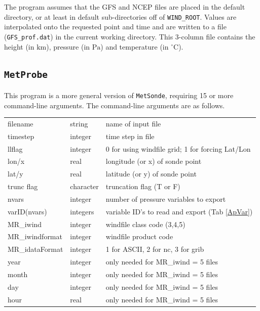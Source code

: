 \documentclass[11pt]{article}   %
\begin{document}
The program assumes that the GFS and NCEP files are placed in the default directory, or
at least in default sub-directories off of \texttt{WIND\_ROOT}.  Values are interpolated
onto the requested point and time and are written to a file (\texttt{GFS\_prof.dat}) in
the current working directory.  This 3-column file contains the height (in $\mathrm{km}$),
pressure (in $\mathrm{Pa}$) and temperature (in $^{\circ}\mathrm{C}$).

\subsection{\texttt{MetProbe}}
This program is a more general version of \texttt{MetSonde}, requiring 15 or more command-line
arguments.  The command-line arguments are as follows.
\\
\begin{tabular}{ l  l  l }
filename        & string    & name of input file \\
timestep        & integer   & time step in file \\
llflag          & integer   & 0 for using windfile grid; 1 for forcing Lat/Lon \\
lon/x           & real      & longitude (or x) of sonde point \\
lat/y           & real      & latitude (or y) of sonde point \\
trunc flag      & character & truncation flag (T or F) \\
nvars           & integer   & number of pressure variables to export \\
varID(nvars)    & integers  & variable ID's to read and export (Tab \ref{ApVar}) \\
MR\_iwind       & integer   & windfile class code (3,4,5) \\
MR\_iwindformat & integer   & windfile product code \\
MR\_idataFormat & integer   & 1 for ASCII, 2 for nc, 3 for grib \\
year            & integer   & only needed for MR\_iwind = 5 files \\
month           & integer   & only needed for MR\_iwind = 5 files \\
day             & integer   & only needed for MR\_iwind = 5 files \\
hour            & real      & only needed for MR\_iwind = 5 files \\
\end{tabular}
\end{document}
